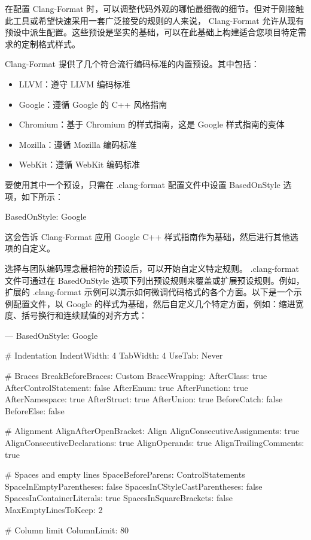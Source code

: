 

在配置 Clang-Format 时，可以调整代码外观的哪怕最细微的细节。但对于刚接触此工具或希望快速采用一套广泛接受的规则的人来说， Clang-Format 允许从现有预设中派生配置。这些预设是坚实的基础，可以在此基础上构建适合您项目特定需求的定制格式样式。


Clang-Format 提供了几个符合流行编码标准的内置预设。其中包括：

\begin{itemize}
\item
LLVM：遵守 LLVM 编码标准

\item
Google：遵循 Google 的 C++ 风格指南

\item
Chromium：基于 Chromium 的样式指南，这是 Google 样式指南的变体

\item
Mozilla：遵循 Mozilla 编码标准

\item
WebKit：遵循 WebKit 编码标准
\end{itemize}

要使用其中一个预设，只需在 .clang-format 配置文件中设置 BasedOnStyle 选项，如下所示：

\begin{shell}
BasedOnStyle: Google
\end{shell}

这会告诉 Clang-Format 应用 Google C++ 样式指南作为基础，然后进行其他选项的自定义。


选择与团队编码理念最相符的预设后，可以开始自定义特定规则。 .clang-format 文件可通过在 BasedOnStyle 选项下列出预设规则来覆盖或扩展预设规则。例如，扩展的 .clang-format 示例可以演示如何微调代码格式的各个方面。以下是一个示例配置文件，以 Google 的样式为基础，然后自定义几个特定方面，例如：缩进宽度、括号换行和连续赋值的对齐方式：

\begin{shell}
---
BasedOnStyle: Google

# Indentation
IndentWidth: 4
TabWidth: 4
UseTab: Never

# Braces
BreakBeforeBraces: Custom
BraceWrapping:
    AfterClass: true
    AfterControlStatement: false
    AfterEnum: true
    AfterFunction: true
    AfterNamespace: true
    AfterStruct: true
    AfterUnion: true
    BeforeCatch: false
    BeforeElse: false

# Alignment
AlignAfterOpenBracket: Align
AlignConsecutiveAssignments: true
AlignConsecutiveDeclarations: true
AlignOperands: true
AlignTrailingComments: true

# Spaces and empty lines
SpaceBeforeParens: ControlStatements
SpaceInEmptyParentheses: false
SpacesInCStyleCastParentheses: false
SpacesInContainerLiterals: true
SpacesInSquareBrackets: false
MaxEmptyLinesToKeep: 2

# Column limit
ColumnLimit: 80
\end{shell}

